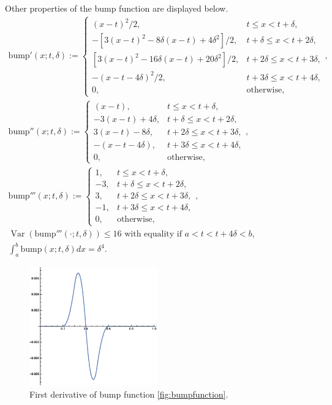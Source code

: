 \documentclass{iitthesis}
\DeclareMathOperator{\Var}{Var}
\theoremstyle{definition}
\theoremstyle{remark}
\begin{document}
Other properties of the bump function are displayed below.
\begin{subequations}
\begin{gather}
\text{bump}'(x;t,\delta):= \begin{cases} \displaystyle (x-t)^{2}/2, & t \le x < t+\delta,\\[1ex]
\displaystyle -[3(x-t)^{2}-8\delta(x-t)+4\delta^2]/2, & t+\delta \le x < t+2\delta,\\[1ex]
\displaystyle [3(x-t)^{2}-16\delta(x-t)+20\delta^2]/2, & t+2\delta \le x < t+3\delta,\\[1ex]
\displaystyle -(x-t-4\delta)^2/2, & t+3\delta \le x < t+4\delta,\\[1ex]
\displaystyle  0, & \text{otherwise},
\end{cases}, \\
\text{bump}''(x;t,\delta):= \begin{cases} \displaystyle (x-t), & t \le x < t+\delta,\\[1ex]
\displaystyle -3(x-t)+4\delta, & t+\delta \le x < t+2\delta,\\[1ex]
\displaystyle 3(x-t)-8\delta, & t+2\delta \le x < t+3\delta,\\[1ex]
\displaystyle -(x-t-4\delta), & t+3\delta \le x < t+4\delta,\\[1ex]
\displaystyle  0, & \text{otherwise},
\end{cases}, \\
\text{bump}'''(x;t,\delta):= \begin{cases} \displaystyle 1, & t \le x < t+\delta,\\[1ex]
\displaystyle -3, & t+\delta \le x < t+2\delta,\\[1ex]
\displaystyle 3, & t+2\delta \le x < t+3\delta,\\[1ex]
\displaystyle -1, & t+3\delta \le x < t+4\delta,\\[1ex]
\displaystyle  0, & \text{otherwise},
\end{cases}, \\
\Var(\text{bump}'''(\cdot;t,\delta))\le 16 \text{ with equality if } a<t<t+4\delta<b, \\
\int_{a}^{b}\text{bump}(x;t,\delta)dx=\delta^4.
\end{gather}
\end{subequations}
\begin{figure}[ht]
\centering
\includegraphics[width=5.5cm]{bumpp1.eps}
\caption{First derivative of bump function \ref{fig:bumpfunction}. \label{fig:bumpp1}}
\end{figure}
\end{document}
